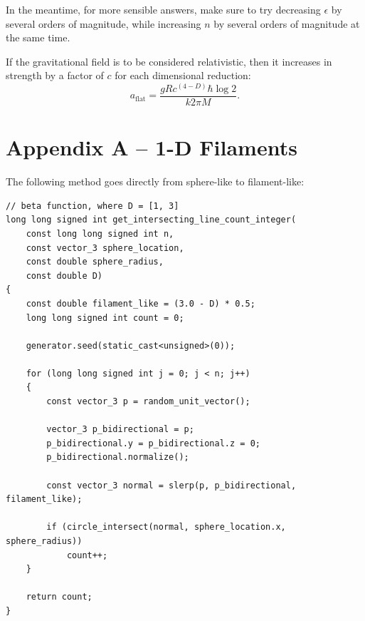 \documentclass[12pt]{article}
\begin{document}
In the meantime, for more sensible answers, make sure to try decreasing $\epsilon$ by several orders of magnitude, while increasing $n$ by several orders of magnitude at the same time.

If the gravitational field is to be considered relativistic, then it increases in strength by a factor of $c$ for each dimensional reduction:
\begin{equation}
a_{\textrm{flat}} = \frac{g R c^{(4 - D)} \hbar \log 2}{k 2 \pi M}.
\end{equation}





\section{Appendix A -- 1-D Filaments}
The following method goes directly from sphere-like to filament-like:
\begin{lstlisting}
// beta function, where D = [1, 3]
long long signed int get_intersecting_line_count_integer(
	const long long signed int n,
	const vector_3 sphere_location,
	const double sphere_radius,
	const double D)
{
	const double filament_like = (3.0 - D) * 0.5;
	long long signed int count = 0;

	generator.seed(static_cast<unsigned>(0));

	for (long long signed int j = 0; j < n; j++)
	{
		const vector_3 p = random_unit_vector();

		vector_3 p_bidirectional = p;
		p_bidirectional.y = p_bidirectional.z = 0;
		p_bidirectional.normalize();

		const vector_3 normal = slerp(p, p_bidirectional, filament_like);

		if (circle_intersect(normal, sphere_location.x, sphere_radius))
			count++;
	}

	return count;
}
\end{lstlisting}
\end{document}
